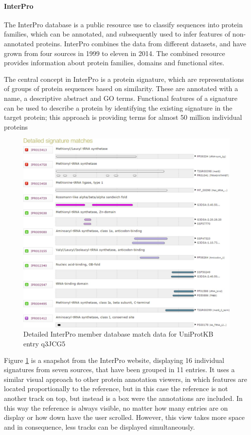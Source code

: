 \paragraph{InterPro} 
The InterPro database is a public resource use to classify sequences into protein families, which can be annotated, and subsequently used to infer features of non-annotated proteins. InterPro combines the data from different datasets, and have grown from four sources in 1999 to eleven in 2014. The combined resource provides information about protein families, domains and functional sites.

The central concept in InterPro is a protein signature, which are representations of groups of protein sequences based on similarity. These are annotated with a name, a descriptive abstract and GO terms. Functional features of a signature can be used to describe a protein by identifying the existing signature in the target protein; this approach is providing terms for almost 50 million individual proteins \cite{MIT2014}

\begin{figure}[ht]
\centering
\includegraphics[width=6in]{figures/interpro.jpg} 
\caption[Interprot Snapshot] {Detailed InterPro member database match data for UniProtKB entry q3JCG5}  \label{fig: interior}
\end{figure}

Figure \ref{fig: interior}  is a snapshot from the InterPro website, displaying 16 individual signatures from seven sources, that have been grouped in 11 entries.
It uses a similar visual approach to other protein annotation viewers, in which features are located proportionally to the reference, but in this case the reference is not another track on top, but instead is a box were the annotations are included. In this way the reference is always visible, no matter how many entries are on display or how down have the user scrolled. However, this view takes more space and in consequence, less tracks can be displayed simultaneously. 

